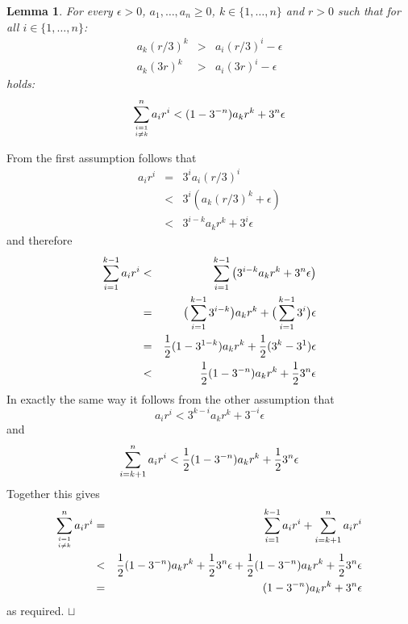 \documentclass{article}
\newtheorem{lemma}{Lemma}
\newenvironment{proof}{\trivlist \item[\hskip \labelsep{\bf Proof$\,$}]}{\hfill\rlap{$\sqcap$}$\sqcup$\par}
\begin{document}
\begin{lemma}\label{lemma:est}
For every $\epsilon > 0$, $a_1,\ldots,a_n \ge 0$, $k\in\{1,\ldots,n\}$ and $r > 0$ such that for all $i\in\{1,\ldots,n\}$:
\begin{eqnarray*}
a_k (r/3)^k &>& a_i (r/3)^i - \epsilon\\
a_k (3r)^k &>& a_i (3r)^i - \epsilon
\end{eqnarray*}
holds:
$$\sum_{i=1\atop i\ne k}^n a_i r^i < (1 - 3^{-n}) a_k r^k + 3^n\epsilon$$
\end{lemma}
\begin{proof}
From the first assumption follows that
\begin{eqnarray*}
a_i r^i &=& 3^i a_i (r/3)^i\\
&<& 3^i (a_k (r/3)^k + \epsilon)\\
&<& 3^{i-k} a_k r^k + 3^i\epsilon
\end{eqnarray*}
and therefore
\begin{eqnarray*}
\sum_{i=1}^{k-1} a_i r^i &<& \sum_{i=1}^{k-1} \left(3^{i-k} a_k r^k + 3^n\epsilon\right)\\
&=& \big(\sum_{i=1}^{k-1} 3^{i-k}\big) a_k r^k + \big(\sum_{i=1}^{k-1} 3^i\big)\epsilon\\
&=& {1\over 2}(1-3^{1-k}) a_k r^k + {1\over 2}(3^k-3^1)\epsilon\\
&<& {1\over 2}(1 - 3^{-n}) a_k r^k + {1\over 2}3^n\epsilon
\end{eqnarray*}
%
In exactly the same way it follows from the other assumption that
$$a_i r^i < 3^{k-i} a_k r^k + 3^{-i}\epsilon$$
and
$$\sum_{i=k+1}^n a_i r^i < {1\over 2}(1 - 3^{-n}) a_k r^k + {1\over 2}3^n\epsilon$$
%
Together this gives
\begin{eqnarray*}
\sum_{i=1\atop i\ne k}^n a_i r^i &=& \sum_{i=1}^{k-1} a_i r^i + \sum_{i=k+1}^n a_i r^i\\
&<& {1\over 2}(1 - 3^{-n}) a_k r^k + {1\over 2}3^n\epsilon + {1\over 2}(1 - 3^{-n}) a_k r^k + {1\over 2}3^n\epsilon\\
&=& (1 - 3^{-n}) a_k r^k + 3^n\epsilon
\end{eqnarray*}
as required.
\end{proof}
\end{document}
